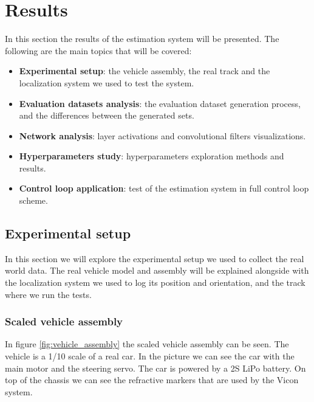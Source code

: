 \documentclass[a4paper,12pt,sort&compress]{article}
\begin{document}
\section{Results} \label{sec:results}
    In this section the results of the estimation system will be presented. The following are the
    main topics that will be covered:
    \begin{itemize}
        \item \textbf{Experimental setup}: the vehicle assembly, the real track and the localization
        system we used to test the system.
        \item \textbf{Evaluation datasets analysis}: the evaluation dataset generation process, and the
        differences between the generated sets.
        \item \textbf{Network analysis}: layer activations and convolutional filters visualizations.
        \item \textbf{Hyperparameters study}: hyperparameters exploration methods and results.
        \item \textbf{Control loop application}: test of the estimation system in full control loop scheme.
    \end{itemize}

\pagebreak


\subsection{Experimental setup} \label{sec:exp_setup}
    In this section we will explore the experimental setup we used to collect the real world data.
    The real vehicle model and assembly will be explained alongside with the localization system we
    used to log its position and orientation, and the track where we run the tests.

\subsubsection*{Scaled vehicle assembly}

    In figure \ref{fig:vehicle_assembly} the scaled vehicle assembly can be seen. The vehicle is a 1/10 scale
    of a real car. In the picture we can see the car with the main motor and the steering servo. The
    car is powered by a 2S LiPo battery. On top of the chassis we can see the refractive markers
    that are used by the Vicon system.  
\end{document}
